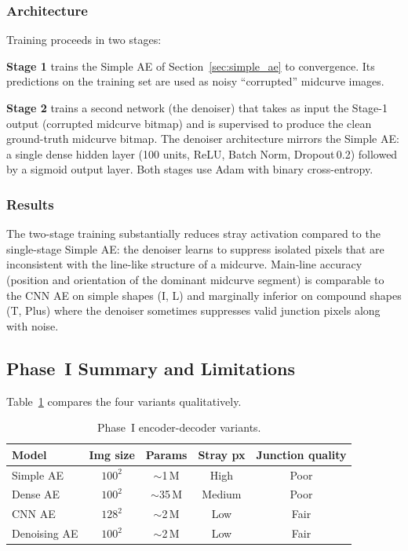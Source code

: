 \documentclass[journal]{IEEEtran}
\begin{document}
\subsubsection{Architecture}

Training proceeds in two stages:

\textbf{Stage 1} trains the Simple AE of Section~\ref{sec:simple_ae} to
convergence.  Its predictions on the training set are used as noisy
``corrupted'' midcurve images.

\textbf{Stage 2} trains a second network (the denoiser) that takes as input
the Stage-1 output (corrupted midcurve bitmap) and is supervised to produce
the clean ground-truth midcurve bitmap.  The denoiser architecture mirrors the
Simple AE: a single dense hidden layer (100 units, ReLU, Batch Norm,
Dropout\,0.2) followed by a sigmoid output layer.  Both stages use Adam with
binary cross-entropy.

\subsubsection{Results}

The two-stage training substantially reduces stray activation compared to the
single-stage Simple AE: the denoiser learns to suppress isolated pixels that
are inconsistent with the line-like structure of a midcurve.  Main-line
accuracy (position and orientation of the dominant midcurve segment) is
comparable to the CNN AE on simple shapes (I, L) and marginally inferior on
compound shapes (T, Plus) where the denoiser sometimes suppresses valid junction
pixels along with noise.

\subsection{Phase~I Summary and Limitations}

Table~\ref{tab:phase1_summary} compares the four variants qualitatively.

\begin{table}[!t]
\centering
\caption{Phase~I encoder-decoder variants.}
\label{tab:phase1_summary}
\begin{tabular}{@{}lcccc@{}}
\toprule
\textbf{Model} & \textbf{Img size} & \textbf{Params} & \textbf{Stray px} & \textbf{Junction quality} \\
\midrule
Simple AE     & $100^2$ & $\sim$1\,M  & High   & Poor   \\
Dense AE      & $100^2$ & $\sim$35\,M & Medium & Poor   \\
CNN AE        & $128^2$ & $\sim$2\,M  & Low    & Fair   \\
Denoising AE  & $100^2$ & $\sim$2\,M  & Low    & Fair   \\
\bottomrule
\end{tabular}
\end{table}
\end{document}
